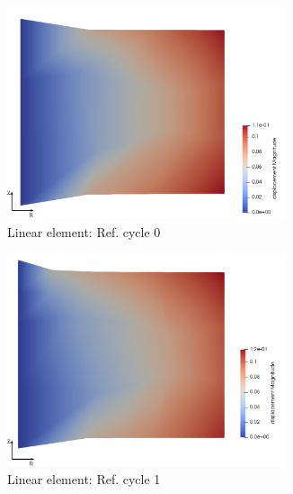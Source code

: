 \documentclass[11pt,a4paper,final]{article}
\begin{document}
\begin{figure}[h]
\centering
\begin{subfigure}[b]{0.35\textwidth}
\centering
\includegraphics[width=0.9\textwidth]{patch_distort_grid_ref_0.pdf}
\caption{Linear element: Ref. cycle 0}
\label{fig:1.2.1}
\end{subfigure}
\begin{subfigure}[b]{0.35\textwidth}
\centering
\includegraphics[width=0.9\textwidth]{patch_distort_grid_ref_1.pdf}
\caption{Linear element: Ref. cycle 1}
\label{fig:1.2.2}
\end{subfigure}
\begin{subfigure}[b]{0.35\textwidth}
\centering

\end{subfigure}
\end{figure}
\end{document}
